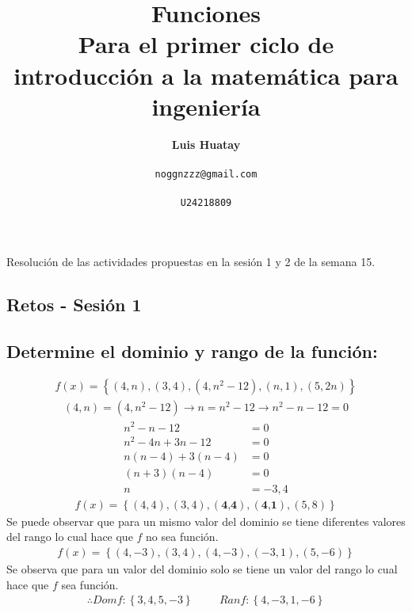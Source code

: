 \documentclass[10pt, a4paper]{article}
\title{\textbf{Funciones} \\ 
\vspace{0.5cm}
\large \textbf{Para el primer ciclo de introducción a la matemática para ingeniería}}
\author{\textbf{Luis Huatay}\\\\\texttt{noggnzzz@gmail.com}\\\\\texttt{U24218809}}
\begin{document}
\maketitle
\begin{center}
Resolución de las actividades propuestas en la sesión 1 y 2 de la semana 15.
\end{center}
\restoregeometry

\newpage
{}
\setlength{\columnseprule}{0.5pt}
\begin{multicols*}{2}
  \section{Retos - Sesión 1}
  \vspace{-0.3cm}
  \subsection{\small Determine el dominio y rango de la función:}
  \vspace{-0.8cm}
  \begin{align*}
    f(x)=\left\{ \left(4,n\right),\left(3,4\right),\left(4,n^2 - 12\right),\left(n,1\right),\left(5,2n\right)\right\}
  \end{align*}
  \vspace{-0.2cm}
  \begin{align*}
    \left(4,n\right) = \left(4,n^2 - 12\right) \rightarrow n = n^2 - 12 \rightarrow n^2 - n - 12 = 0
  \end{align*}
  \vspace{-0.8cm}
  \begin{align*}
    n^2 - n - 12 &= 0\\
    n^2 - 4n + 3n - 12 &= 0\\
    n\left(n-4\right)+3\left(n-4\right) &= 0\\
    \left(n+3\right)\left(n-4\right) &= 0\\
    n &= -3,4
  \end{align*}
  \begin{align*}
    f(x)=\left\{ \left(4,4\right),\left(3,4\right),\left(\textbf{4,4}\right),\left(\textbf{4,1}\right),\left(5,8\right)\right\}
  \end{align*}
  Se puede observar que para un mismo valor del dominio se tiene diferentes valores del rango lo cual hace que $f$ no sea función.\\
  \vspace{-0.2cm}
  \begin{align*}
    f(x)=\left\{ \left(4,-3\right),\left(3,4\right),\left(4,-3\right),\left(-3,1\right),\left(5,-6\right)\right\}
  \end{align*}
  Se observa que para un valor del dominio solo se tiene un valor del rango lo cual hace que $f$ sea función.
  \begin{align*}
    \therefore Domf: \left\{3,4,5,-3\right\} \hspace{1cm} Ranf: \left\{4,-3,1,-6\right\}
  \end{align*}

\end{multicols*}
\end{document}
